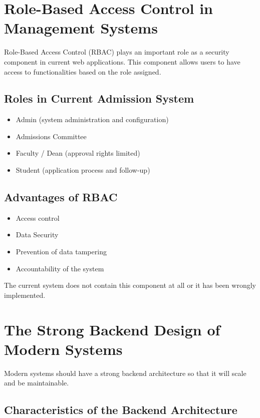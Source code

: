 \section{Role-Based Access Control in Management Systems}

Role-Based Access Control (RBAC) plays an important role as a security component in current web applications. This component allows users to have access to functionalities based on the role assigned.

\subsection*{Roles in Current Admission System}

\begin{itemize}
    \item Admin (system administration and configuration)
    \item Admissions Committee
    \item Faculty / Dean (approval rights limited)
    \item Student (application process and follow-up)
\end{itemize}

\subsection*{Advantages of RBAC}

\begin{itemize}
    \item Access control
    \item Data Security
    \item Prevention of data tampering
    \item Accountability of the system
\end{itemize}

The current system does not contain this component at all or it has been wrongly implemented.

\section{The Strong Backend Design of Modern Systems}

Modern systems should have a strong backend architecture so that it will scale and be maintainable.

\subsection*{Characteristics of the Backend Architecture}


